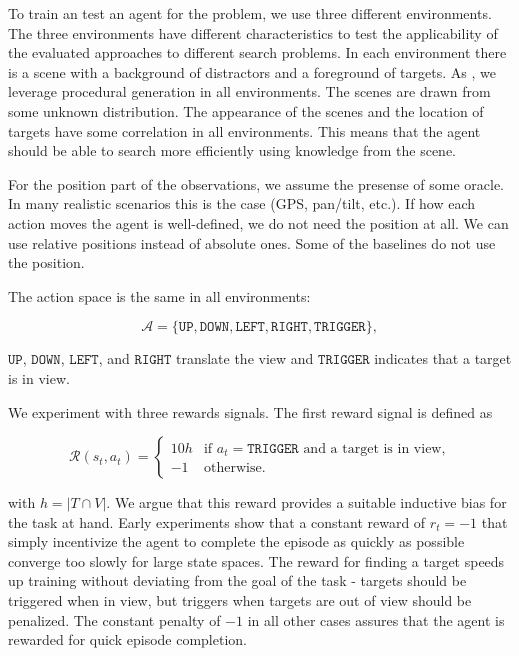 To train an test an agent for the problem, we use three different environments.
The three environments have different characteristics to test the applicability of the evaluated approaches to different search problems.
In each environment there is a scene with a background of distractors and a foreground of targets.
As \cite{cobbe_procgen_2020,mnih_asynchronous_2016}, we leverage procedural generation in all environments.
The scenes are drawn from some unknown distribution.
The appearance of the scenes and the location of targets have some correlation in all environments.
This means that the agent should be able to search more efficiently using knowledge from the scene.

For the position part of the observations, we assume the presense of some oracle.
In many realistic scenarios this is the case (GPS, pan/tilt, etc.).
If how each action moves the agent is well-defined, we do not need the position at all.
We can use relative positions instead of absolute ones.
Some of the baselines do not use the position.

The action space is the same in all environments:

\[
    \mathcal{A} = \lbrace \mathtt{UP}, \mathtt{DOWN}, \mathtt{LEFT}, \mathtt{RIGHT}, \mathtt{TRIGGER} \rbrace,
\]

\(\mathtt{UP}\), \(\mathtt{DOWN}\), \(\mathtt{LEFT}\), and \(\mathtt{RIGHT}\) translate the view and \(\mathtt{TRIGGER}\) indicates that a target is in view.

We experiment with three rewards signals.
The first reward signal is defined as

\[
    \mathcal{R}(s_t, a_t) =
    \begin{cases}
        10h & \text{if \(a_t = \mathtt{TRIGGER}\) and a target is in view,} \\
        -1  & \text{otherwise.}
    \end{cases}
\]

with \(h = \left\lvert T \cap V \right\rvert\). 
We argue that this reward provides a suitable inductive bias for the task at hand.
Early experiments show that a constant reward of \(r_t = -1\) that simply incentivize the agent to complete the episode as quickly as possible converge too slowly for large state spaces.
The reward for finding a target speeds up training without deviating from the goal of the task -
targets should be triggered when in view, but triggers when targets are out of view should be penalized.
The constant penalty of \(-1\) in all other cases assures that the agent is rewarded for quick episode completion.

